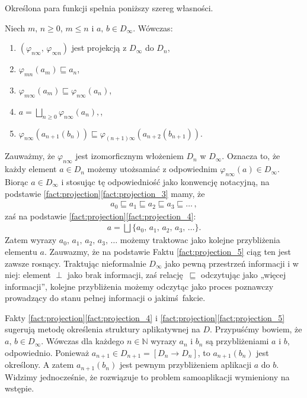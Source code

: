 Określona para funkcji spełnia poniższy szereg własności.

\begin{fakt}\label{fact:projection}%
Niech \(m,\,n\geq 0\), \(m\leq n\) i \(a,\,b\in D_\infty\). Wówczas:
\begin{enumerate}[label={(\roman*)}, ref={(\roman*)}] 
  \setlength\itemsep{0em}
  \item \((\varphi_{n\infty},\,\varphi_{\infty n})\) jest projekcją z \(D_\infty\) do \(D_n\),\label{fact:projection_1}
\item \(\varphi_{mn}(a_m)\sqsubseteq a_n\),\label{fact:projection_2}
\item \(\varphi_{m\infty}(a_m)\sqsubseteq \varphi_{n\infty}(a_n)\),\label{fact:projection_3}
\item \(a=\bigsqcup_{n\geq 0}\varphi_{n\infty}(a_n),\),\label{fact:projection_4}
\item \(\varphi_{n\infty}(a_{n+1}(b_n))\sqsubseteq\varphi_{(n+1)\infty}(a_{n+2}(b_{n+1}))\).\label{fact:projection_5}
\end{enumerate}
\end{fakt}

Zauważmy, że \(\varphi_{n\infty}\) jest izomorficznym włożeniem \(D_n\) w \(D_\infty\). Oznacza to, że każdy element \(a\in D_n\) możemy utożsamiać z odpowiednim \(\varphi_{n\infty}(a)\in D_\infty\). Biorąc \(a\in D_\infty\) i stosując tę odpowiedniość jako konwencję notacyjną, na podstawie \ref{fact:projection}\ref{fact:projection_3} mamy, że
\begin{align*}
 a_0 \sqsubseteq  a_1 \sqsubseteq a_2 \sqsubseteq a_3 \sqsubseteq \dots\,,
\end{align*}
zaś na podstawie \ref{fact:projection}\ref{fact:projection_4}:
\begin{align*}
  a=\bigsqcup\{a_0,\,a_1,\,a_2,\,a_3,\,\dots\}.
\end{align*}
Zatem wyrazy \(a_0,\,a_1,\,a_2,\,a_3,\,\dots\) możemy traktowac jako kolejne przybliżenia elementu \(a\). Zauwazmy, że na podstawie Faktu \ref{fact:projection_5} ciąg ten jest zawsze rosnący. Traktując nieformalnie \(D_\infty\) jako pewną przestrzeń informacji i w niej: element \(\perp\) jako brak informacji, zaś relację \(\sqsubseteq\) odczytując jako „więcej informacji”, kolejne przybliżenia możemy odczytąc jako proces poznawczy prowadzący do stanu pełnej informacji o jakimś fakcie.

Fakty \ref{fact:projection}\ref{fact:projection_4} i \ref{fact:projection}\ref{fact:projection_5} sugerują metodę określenia struktury aplikatywnej na \(D\). Przypuśćmy bowiem, że \(a,\,b\in D_\infty\). Wówczas dla każdego \(n\in\mathbb{N}\) wyrazy \(a_n\) i \(b_n\) są przybliżeniami \(a\) i \(b\), odpowiednio. Ponieważ \(a_{n+1}\in  D_{n+1}=[D_n\to D_n]\), to \(a_{n+1}(b_n)\) jest określony. A zatem \(a_{n+1}(b_n)\) jest pewnym przybliżeniem aplikacji \(a\) do \(b\). Widzimy jednocześnie, że rozwiązuje to problem samoaplikacji wymieniony na wstępie. 

